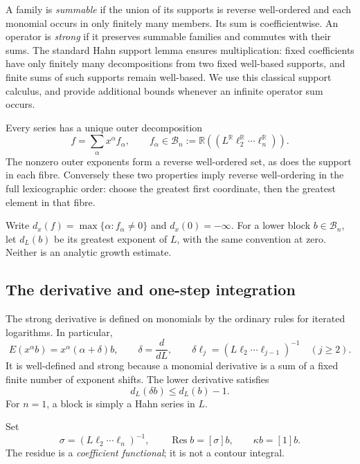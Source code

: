 \documentclass[11pt,a4paper]{article}
\numberwithin{equation}{section}
\theoremstyle{definition}
\theoremstyle{remark}
\theoremstyle{definition}
\newcommand{\R}{\mathbb R}
\newcommand{\Bb}{\mathcal B}
\newcommand{\Res}{\operatorname{Res}}
\newcommand{\dx}{d_x}
\newcommand{\dl}{d_L}
\newcommand{\coef}[2]{[#1]#2}
\begin{document}
A family is \emph{summable} if the union of its supports is reverse well-ordered and each monomial occurs in only finitely many members. Its sum is coefficientwise. An operator is \emph{strong} if it preserves summable families and commutes with their sums. The standard Hahn support lemma ensures multiplication: fixed coefficients have only finitely many decompositions from two fixed well-based supports, and finite sums of such supports remain well-based. We use this classical support calculus, and provide additional bounds whenever an infinite operator sum occurs.

Every series has a unique outer decomposition
\begin{equation}
 f=\sum_\alpha x^\alpha f_\alpha,
 \qquad f_\alpha\in\Bb_n
 :=\R((L^\R\ell_2^\R\cdots\ell_n^\R)).
 \label{eq:outer}
\end{equation}
The nonzero outer exponents form a reverse well-ordered set, as does the support in each fibre. Conversely these two properties imply reverse well-ordering in the full lexicographic order: choose the greatest first coordinate, then the greatest element in that fibre.

Write $\dx(f)=\max\{\alpha:f_\alpha\ne0\}$ and $\dx(0)=-\infty$. For a lower block $b\in\Bb_n$, let $\dl(b)$ be its greatest exponent of $L$, with the same convention at zero. Neither is an analytic growth estimate.

\subsection{The derivative and one-step integration}
The strong derivative is defined on monomials by the ordinary rules for iterated logarithms. In particular,
\[
 E(x^\alpha b)=x^\alpha(\alpha+\delta)b,
 \qquad \delta=\frac{d}{dL},\qquad
 \delta\ell_j=(L\ell_2\cdots\ell_{j-1})^{-1}\quad(j\ge2).
\]
It is well-defined and strong because a monomial derivative is a sum of a fixed finite number of exponent shifts. The lower derivative satisfies
\begin{equation}
 \dl(\delta b)\le\dl(b)-1.
 \label{eq:lowerdrop}
\end{equation}
For $n=1$, a block is simply a Hahn series in $L$.

Set
\begin{equation}
 \sigma=(L\ell_2\cdots\ell_n)^{-1},\qquad
 \Res b=\coef{\sigma}{b},\qquad
 \kappa b=\coef{1}{b}.
 \label{eq:residue}
\end{equation}
The residue is a \emph{coefficient functional}; it is not a contour integral.
\end{document}
